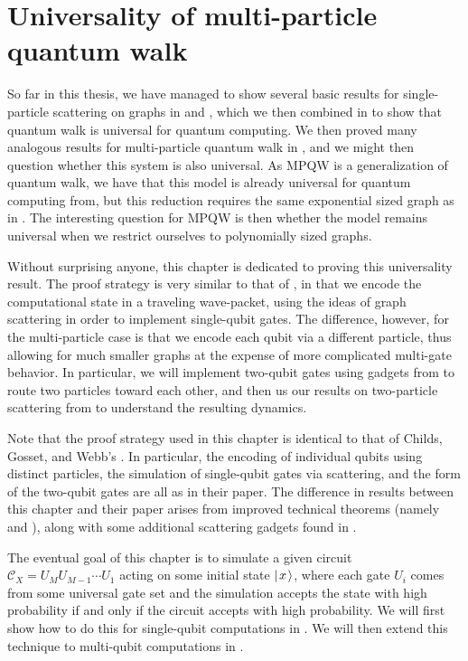\documentclass[../thesis-main/thesis-main]{subfiles}
\begin{document}
\chapter{Universality of multi-particle quantum walk}
\label{chap:MP_universality}

So far in this thesis, we have managed to show several basic results for single-particle scattering on graphs in  and , which we then combined in  to show that quantum walk is universal for quantum computing.  We then proved many analogous results for multi-particle quantum walk in , and we might then question whether this system is also universal.  As MPQW is a generalization of quantum walk, we have that this model is already universal for quantum computing from, but this reduction requires the  same exponential sized graph as in .  The interesting question for MPQW is then whether the model remains universal when we restrict ourselves to polynomially sized graphs.

Without surprising anyone, this chapter is dedicated to proving this universality result.  The proof strategy is very similar to that of , in that we encode the computational state in a traveling wave-packet, using the ideas of graph scattering in order to implement single-qubit gates.  The difference, however, for the multi-particle case is that we encode each qubit via a different particle, thus allowing for much smaller graphs at the expense of more complicated multi-gate behavior.  In particular, we will implement two-qubit gates using gadgets from  to route two particles toward each other, and then us our results on two-particle scattering from  to understand the resulting dynamics.

Note that the proof strategy used in this chapter is identical to that of Childs, Gosset, and Webb's \cite{MPQW}.  In particular, the encoding of individual qubits using distinct particles, the simulation of single-qubit gates via scattering, and the form of the two-qubit gates are all as in their paper.  The difference in results between this chapter and their paper arises from improved technical theorems (namely  and ), along with some additional scattering gadgets found in .  

The eventual goal of this chapter is to simulate a given circuit $\mathcal{C}_X = U_{M} U_{M-1}\cdots U_1$ acting on some initial state $|\mspace{2mu} x \mspace{2mu} \rangle$, where each gate $U_i$ comes from some universal gate set and the simulation accepts the state with high probability if and only if the circuit accepts with high probability.  We will first show how to do this for single-qubit computations in .  We will then extend this technique to multi-qubit computations in .
\end{document}
